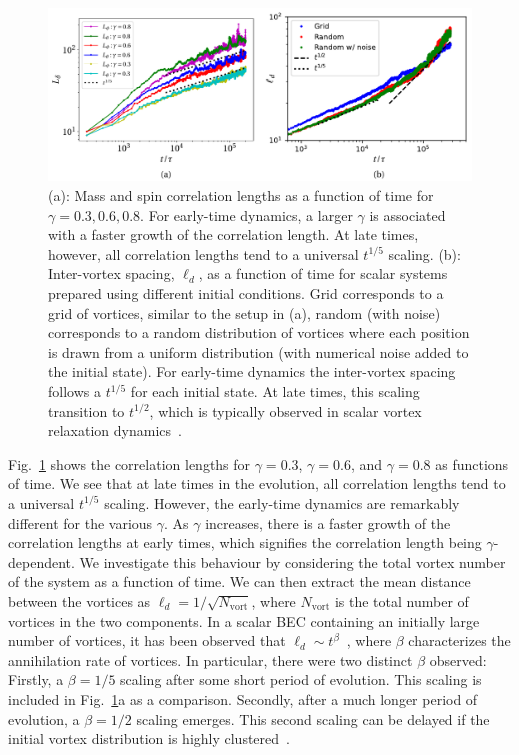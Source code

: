 \begin{figure}
    \centering
    \includegraphics[width=\textwidth]{
        gfx/ch-twoCompDynamics/two-component-correlation-lengths.pdf}
    \caption[Mass and spin correlation lengths associated with HQV relaxation
    dynamics, in addition to inter-vortex spacing in a scalar system]
    {\label{fig: correlation-lengths}
    (a): Mass and spin correlation
    lengths as a function of time for \(\gamma=0.3,0.6, 0.8\).
    For early-time dynamics, a larger \(\gamma \) is associated with a faster
    growth of the correlation length.
    At late times, however, all correlation lengths tend to a universal
    \(t^{1/5}\) scaling.
    (b): Inter-vortex spacing, \(\ell_d\), as a function of time for scalar
    systems prepared using different initial conditions.
    Grid corresponds to a grid of vortices, similar to the setup in (a), random
    (with noise) corresponds to a random distribution of vortices where each
    position is drawn from a uniform distribution (with numerical noise added
    to the initial state).
    For early-time dynamics the inter-vortex spacing follows a
    \(t^{1/5}\) for each initial state.
    At late times, this scaling transition to \(t^{1/2}\), which is typically
    observed in scalar vortex relaxation dynamics~\cite{Nowak2012}.
    }
\end{figure}
Fig.~\ref{fig: correlation-lengths} shows the correlation lengths for
\(\gamma=0.3\), \(\gamma=0.6\), and \(\gamma=0.8\) as functions of time.
We see that at late times in the evolution, all correlation lengths tend to a
universal \(t^{1/5}\) scaling.
However, the early-time dynamics are remarkably different for the various
\(\gamma \).
As \(\gamma \) increases, there is a faster growth of the correlation lengths at
early times, which signifies the correlation length being \(\gamma \)-dependent.
We investigate this behaviour by considering the total vortex number of
the system as a function of time.
We can then extract the mean distance between the vortices as
\(\ell_d=1/\sqrt{N_\mathrm{vort}}\), where \(N_\mathrm{vort}\) is the total
number of vortices in the two components.
In a scalar BEC containing an initially large number of vortices, it has been
observed that \(\ell_d \sim t^\beta \)~\cite{Karl2017}, where \(\beta \)
characterizes the annihilation rate of vortices.
In particular, there were two distinct \(\beta \) observed: Firstly, a
\(\beta=1/5\) scaling after some short period of evolution.
This scaling is included in Fig.~\ref{fig: correlation-lengths}a as a
comparison.
Secondly, after a much longer period of evolution, a \(\beta=1/2\) scaling
emerges.
This second scaling can be delayed if the initial vortex distribution is
highly clustered~\cite{Karl2017}.

